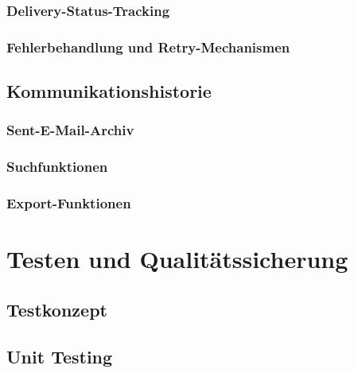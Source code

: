 \documentclass[11pt,a4paper]{article}
\begin{document}
\subsubsection{Delivery-Status-Tracking}

\subsubsection{Fehlerbehandlung und Retry-Mechanismen}

\subsection{Kommunikationshistorie}

\subsubsection{Sent-E-Mail-Archiv}

\subsubsection{Suchfunktionen}

\subsubsection{Export-Funktionen}

\newpage
\section{Testen und Qualitätssicherung}

\subsection{Testkonzept}

\subsection{Unit Testing}
\end{document}

